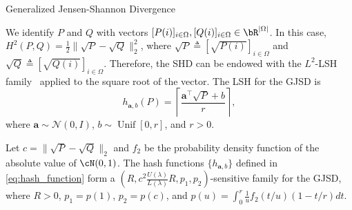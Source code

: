 \documentclass[final]{beamer}
\newlength{\threecolwid}
\begin{document}
\begin{frame}[t]
\begin{columns}[t]
\begin{column}{\threecolwid}
\begin{block}{Generalized Jensen-Shannon 
			Divergence}
		
		We  
		identify $ P $ and $Q$ with vectors 
		$[P(i)]_{i\in 
			\Omega}, [Q(i)]_{i\in \Omega}\in \bR^{|\Omega|} $.
		In this case, 
		$
		H^2(P, Q) = \frac{1}{2} \| \sqrt{P}-\sqrt{Q} \|_2^2$, where $ 
		\sqrt{P} \triangleq [\sqrt{P(i)}]_{i\in \Omega} $ and $ \sqrt{Q} 
		\triangleq 
		[\sqrt{Q(i)}]_{i\in \Omega} $.
		Therefore, the SHD can be 
		endowed with the $ L^2 $-LSH family~\citep{datar2004locality} applied 
		to the 
		square root of the vector. 
		The LSH for the 
		GJSD is 
		\begin{equation}\label{eq:hash_function}
		h_{\mathbf{a}, b}(P) = \left\lceil  \frac{\mathbf{a}^\top \sqrt{P} +b 
		}{r} 
		\right\rceil,
		\end{equation}
		where $ \mathbf{a}\sim \mathcal{N}(0, I) $,
		$ b\sim \operatorname{Unif}[0, r] $,
		  and $ r>0 $.
		
			Let $ c= \| 
			\sqrt{P}-\sqrt{Q} \|_2$ and $ f_2 $ be the probability density 
			function of the 
			absolute value of $ \cN(0,1) $.	The hash 
			functions $ 
			\{h_{\mathbf{a},b}\}  $ defined in \eqref{eq:hash_function} form a 
			$ (R,c^2\frac{U(\lambda)}{L(\lambda)}R,p_1,p_2) 
			$-sensitive 
			family for the 
			GJSD,
			where $ R>0 
			$, $ p_1 = p(1) $, $ p_2=p(c) $, and $
			p(u) = \int_0^r \frac{1}{u}f_2(t/u)(1-t/r)dt$.
		

\end{block}
\end{column}
\end{columns}
\end{frame}
\end{document}

